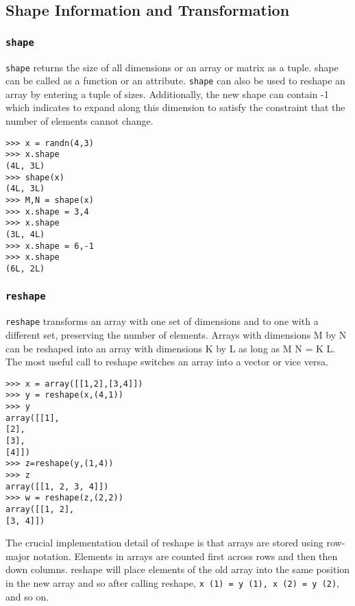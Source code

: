 \documentclass[KSmain.tex]{subfiles}
\begin{document}

\subsection{Shape Information and Transformation}

\subsubsection{\texttt{shape}}

\texttt{shape} returns the size of all dimensions or an array or matrix as a tuple. shape can be called as a function
or an attribute. \texttt{shape} can also be used to reshape an array by entering a tuple of sizes. Additionally, the
new shape can contain -1 which indicates to expand along this dimension to satisfy the constraint that
the number of elements cannot change.
\begin{framed}
\begin{verbatim}
>>> x = randn(4,3)
>>> x.shape
(4L, 3L)
>>> shape(x)
(4L, 3L)
>>> M,N = shape(x)
>>> x.shape = 3,4
>>> x.shape
(3L, 4L)
>>> x.shape = 6,-1
>>> x.shape
(6L, 2L)
\end{verbatim}
\end{framed}
\subsubsection{\texttt{reshape}}

\texttt{reshape}  transforms an array with one set of dimensions and to one with a different set, preserving the
number of elements. Arrays with dimensions M by N can be reshaped into an array with dimensions K
by L as long as M N = K L. The most useful call to reshape switches an array into a vector or vice versa.
\begin{framed}
\begin{verbatim}
>>> x = array([[1,2],[3,4]])
>>> y = reshape(x,(4,1))
>>> y
array([[1],
[2],
[3],
[4]])
>>> z=reshape(y,(1,4))
>>> z
array([[1, 2, 3, 4]])
>>> w = reshape(z,(2,2))
array([[1, 2],
[3, 4]])
\end{verbatim}
\end{framed}
The crucial implementation detail of reshape is that arrays are stored using row-major notation. Elements
in arrays are counted first across rows and then then down columns. reshape will place elements of the
old array into the same position in the new array and so after calling reshape, \texttt{x (1) = y (1), x (2) = y (2)},
and so on.
\end{document}
